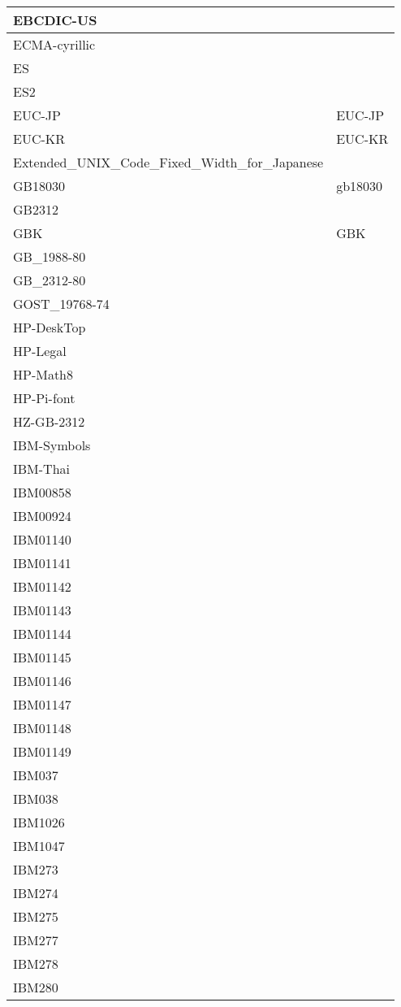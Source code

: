 \documentclass{wg21}
\begin{document}
\begin{longtable}{| p{} | p{} |}
EBCDIC-US & \\ \hline
ECMA-cyrillic & \\ \hline
ES & \\ \hline
ES2 & \\ \hline
EUC-JP & EUC-JP\\ \hline
EUC-KR & EUC-KR\\ \hline
Extended_UNIX_Code_Fixed_Width_for_Japanese & \\ \hline
GB18030 & gb18030\\ \hline
GB2312 & \\ \hline
GBK & GBK\\ \hline
GB_1988-80 & \\ \hline
GB_2312-80 & \\ \hline
GOST_19768-74 & \\ \hline
HP-DeskTop & \\ \hline
HP-Legal & \\ \hline
HP-Math8 & \\ \hline
HP-Pi-font & \\ \hline
HZ-GB-2312 & \\ \hline
IBM-Symbols & \\ \hline
IBM-Thai & \\ \hline
IBM00858 & \\ \hline
IBM00924 & \\ \hline
IBM01140 & \\ \hline
IBM01141 & \\ \hline
IBM01142 & \\ \hline
IBM01143 & \\ \hline
IBM01144 & \\ \hline
IBM01145 & \\ \hline
IBM01146 & \\ \hline
IBM01147 & \\ \hline
IBM01148 & \\ \hline
IBM01149 & \\ \hline
IBM037 & \\ \hline
IBM038 & \\ \hline
IBM1026 & \\ \hline
IBM1047 & \\ \hline
IBM273 & \\ \hline
IBM274 & \\ \hline
IBM275 & \\ \hline
IBM277 & \\ \hline
IBM278 & \\ \hline
IBM280 & \\ \hline

\end{longtable}
\end{document}
